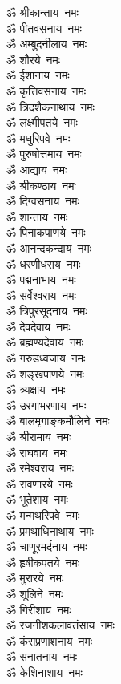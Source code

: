 \begin{multicols}{2}
\begin{flushleft}
ॐ श्रीकान्ताय~नमः\\
ॐ पीतवसनाय~नमः\\
ॐ अम्बुदनीलाय~नमः\\
ॐ शौरये~नमः\\
ॐ ईशानाय~नमः\\
ॐ कृत्तिवसनाय~नमः\\
ॐ त्रिदशैकनाथाय~नमः\\
ॐ लक्ष्मीपतये~नमः\\
ॐ मधुरिपवे~नमः\hfill{}\\
ॐ पुरुषोत्तमाय~नमः\\
ॐ आद्याय~नमः\\
ॐ श्रीकण्ठाय~नमः\\
ॐ दिग्वसनाय~नमः\\
ॐ शान्ताय~नमः\\
ॐ पिनाकपाणये~नमः\\
ॐ आनन्दकन्दाय~नमः\\
ॐ धरणीधराय~नमः\\
ॐ पद्मनाभाय~नमः\\
ॐ सर्वेश्वराय~नमः\hfill{}\\
ॐ त्रिपुरसूदनाय~नमः\\
ॐ देवदेवाय~नमः\\
ॐ ब्रह्मण्यदेवाय~नमः\\
ॐ गरुडध्वजाय~नमः\\
ॐ शङ्खपाणये~नमः\\
ॐ त्र्यक्षाय~नमः\\
ॐ उरगाभरणाय~नमः\\
ॐ बालमृगाङ्कमौलिने~नमः\\
ॐ श्रीरामाय~नमः\\
ॐ राघवाय~नमः\hfill{}\\
ॐ रमेश्वराय~नमः\\
ॐ रावणारये~नमः\\
ॐ भूतेशाय~नमः\\
ॐ मन्मथरिपवे~नमः\\
ॐ प्रमथाधिनाथाय~नमः\\
ॐ चाणूरमर्दनाय~नमः\\
ॐ हृषीकपतये~नमः\\
ॐ मुरारये~नमः\\
ॐ शूलिने~नमः\\
ॐ गिरीशाय~नमः\hfill{}\\
ॐ रजनीशकलावतंसाय~नमः\\
ॐ कंसप्रणाशनाय~नमः\\
ॐ सनातनाय~नमः\\
ॐ केशिनाशाय~नमः\\

\end{flushleft}
\end{multicols}
